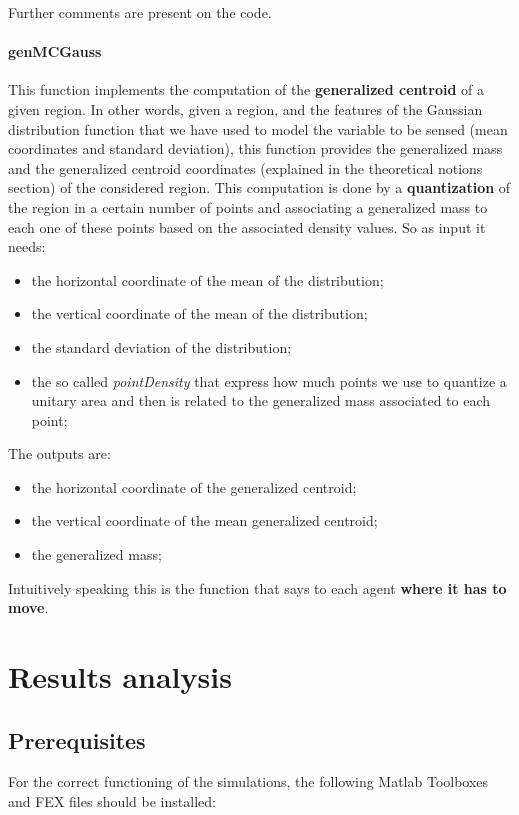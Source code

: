 \documentclass[a4paper,11pt,oneside]{book}
\begin{document}
Further comments are present on the code.\\

	
\subsubsection{genMCGauss}
	
	This function implements the computation of the \textbf{generalized centroid} of a given region. In other words, given a region, and the features of the Gaussian distribution function that we have used to model the variable to be sensed (mean coordinates and standard deviation), this function provides the generalized mass and the generalized centroid coordinates (explained in the theoretical notions section) of the considered region. This computation is done by a \textbf{quantization} of the region in a certain number of points and associating a generalized mass to each one of these points based on the associated density values. So as input it needs: 
	 \begin{itemize}
	\item the horizontal coordinate of the mean of the distribution;
	\item the vertical coordinate of the mean of the distribution;
	\item the standard deviation of the distribution;
	\item the so called \emph{pointDensity} that express how much points we use to quantize a unitary area and then is related to the generalized mass associated to each point;
\end{itemize}
	The outputs are:
	 \begin{itemize}
	\item the horizontal coordinate of the generalized centroid;
	\item the vertical coordinate of the mean generalized centroid; 
	\item the generalized mass;
\end{itemize}
	Intuitively speaking this is the function that says to each agent \textbf{where it has to move}.
	
	\chapter{Results analysis}
	
	\section{Prerequisites}
	For the correct functioning of the simulations, the following Matlab Toolboxes and FEX files should be installed:
	
\end{document}
